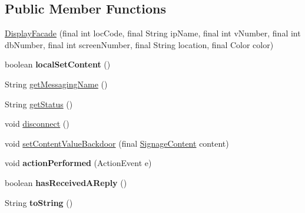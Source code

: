\subsection*{Public Member Functions}
\begin{DoxyCompactItemize}
\item 
\hyperlink{classgov_1_1fnal_1_1ppd_1_1dd_1_1display_1_1DisplayFacade_a44ab17c633b7d08fbe62ebfa8ba9596e}{Display\-Facade} (final int loc\-Code, final String ip\-Name, final int v\-Number, final int db\-Number, final int screen\-Number, final String location, final Color color)
\item 
\hypertarget{classgov_1_1fnal_1_1ppd_1_1dd_1_1display_1_1DisplayFacade_aa103a2459e11731f78208f581d6df230}{boolean {\bfseries local\-Set\-Content} ()}\label{classgov_1_1fnal_1_1ppd_1_1dd_1_1display_1_1DisplayFacade_aa103a2459e11731f78208f581d6df230}

\item 
String \hyperlink{classgov_1_1fnal_1_1ppd_1_1dd_1_1display_1_1DisplayFacade_ad22aeb5c8a46e05ba8afee5f85fa03c4}{get\-Messaging\-Name} ()
\item 
String \hyperlink{classgov_1_1fnal_1_1ppd_1_1dd_1_1display_1_1DisplayFacade_a52ef55dc309ff13a29e56e60df0ec10a}{get\-Status} ()
\item 
void \hyperlink{classgov_1_1fnal_1_1ppd_1_1dd_1_1display_1_1DisplayFacade_a97295fbdea4502156b438b39b498568f}{disconnect} ()
\item 
void \hyperlink{classgov_1_1fnal_1_1ppd_1_1dd_1_1display_1_1DisplayFacade_a98d5e27ef58b716f26938e98d47d3f2f}{set\-Content\-Value\-Backdoor} (final \hyperlink{interfacegov_1_1fnal_1_1ppd_1_1dd_1_1signage_1_1SignageContent}{Signage\-Content} content)
\item 
\hypertarget{classgov_1_1fnal_1_1ppd_1_1dd_1_1display_1_1DisplayFacade_afaa48e979816a840fea8dbffbe5300c7}{void {\bfseries action\-Performed} (Action\-Event e)}\label{classgov_1_1fnal_1_1ppd_1_1dd_1_1display_1_1DisplayFacade_afaa48e979816a840fea8dbffbe5300c7}

\item 
\hypertarget{classgov_1_1fnal_1_1ppd_1_1dd_1_1display_1_1DisplayFacade_a007114c29a3b378a97f389f0dc897786}{boolean {\bfseries has\-Received\-A\-Reply} ()}\label{classgov_1_1fnal_1_1ppd_1_1dd_1_1display_1_1DisplayFacade_a007114c29a3b378a97f389f0dc897786}

\item 
\hypertarget{classgov_1_1fnal_1_1ppd_1_1dd_1_1display_1_1DisplayFacade_a682817a09de18ad0065d76b52baab114}{String {\bfseries to\-String} ()}\label{classgov_1_1fnal_1_1ppd_1_1dd_1_1display_1_1DisplayFacade_a682817a09de18ad0065d76b52baab114}

\end{DoxyCompactItemize}
